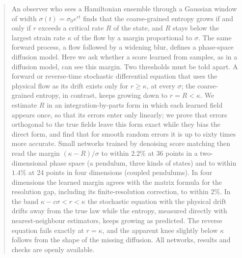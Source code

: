 \begin{abstract}
An observer who sees a Hamiltonian ensemble through a Gaussian window of width $\sigma(t) = \sigma_0 e^{rt}$ finds that the coarse-grained entropy grows if and only if $r$ exceeds a critical rate $R$ of the state, and $R$ stays below the largest strain rate $\kappa$ of the flow by a margin proportional to $\sigma$. The same forward process, a flow followed by a widening blur, defines a phase-space diffusion model. Here we ask whether a score learned from samples, as in a diffusion model, can see this margin. Two thresholds must be told apart. A forward or reverse-time stochastic differential equation that uses the physical flow as its drift exists only for $r \geq \kappa$, at every $\sigma$; the coarse-grained entropy, in contrast, keeps growing down to $r = R < \kappa$. We estimate $R$ in an integration-by-parts form in which each learned field appears once, so that its errors enter only linearly; we prove that errors orthogonal to the true fields leave this form exact while they bias the direct form, and find that for smooth random errors it is up to sixty times more accurate. Small networks trained by denoising score matching then read the margin $(\kappa - R)/\sigma$ to within $2.2\%$ at 36 points in a two-dimensional phase space (a pendulum, three kinds of states) and to within $1.4\%$ at 24 points in four dimensions (coupled pendulums). In four dimensions the learned margin agrees with the matrix formula for the resolution gap, including its finite-resolution correction, to within $2\%$. In the band $\kappa - c\sigma < r < \kappa$ the stochastic equation with the physical drift drifts away from the true law while the entropy, measured directly with nearest-neighbour estimators, keeps growing as predicted. The reverse equation fails exactly at $r = \kappa$, and the apparent knee slightly below $\kappa$ follows from the shape of the missing diffusion. All networks, results and checks are openly available.
\end{abstract}
